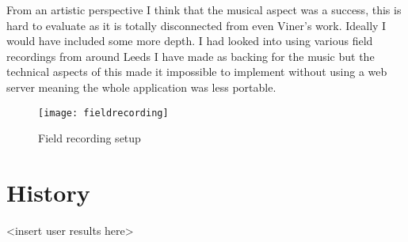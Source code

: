 From an artistic perspective I think that the musical aspect was a success, this
is hard to evaluate as it is totally disconnected from even Viner's work.
Ideally I would have included some more depth. I had looked into using various
field recordings from around Leeds I have made as backing for the music but the
technical aspects of this made it impossible to implement without using a
web server meaning the whole application was less portable.

\begin{figure}[H]
    \centering
    \texttt{[image: fieldrecording]}
    \caption{Field recording setup}
\end{figure}

\section{History}
<insert user results here>
